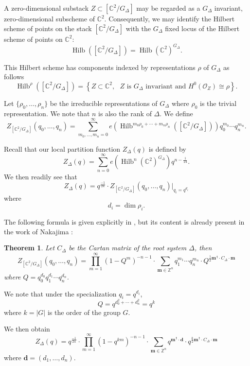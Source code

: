 \documentclass{amsart}
\newtheorem{theorem}{Theorem}[section]
\theoremstyle{definition}
\newcommand{\half}{\frac{1}{2}}
\newcommand{\CC} {{\mathbb C}}          %
\newcommand{\ZZ} {{\mathbb Z}}		%
\renewcommand{\O}{\mathcal{O}}
\renewcommand{\top}{\,\mathsf{t}}
\newcommand{\mvec}{\bm{m}}
\newcommand{\dvec}{\bm{d }}
\newcommand{\Hilb}{\operatorname{Hilb}}
\begin{document}
A zero-dimensional substack $Z\subset [\CC^{2}/G_{\Delta}]$ may be
regarded as a $G_{\Delta}$ invariant, zero-dimensional subscheme of
$\CC^{2}$. Consequently, we may identify the Hilbert scheme of points
on the stack $[\CC^{2}/G_{\Delta}]$ with the $G_{\Delta}$ fixed locus
of the Hilbert scheme of points on $\CC^{2}$: 
\[
\Hilb \left([\CC^{2}/G_{\Delta}] \right) = \Hilb
(\CC^{2})^{G_{\Delta}} .
\]

This Hilbert scheme has components indexed by representations $\rho$
of $G_{\Delta}$ as follows
\begin{equation*}
\Hilb^{\rho} \left([\CC^{2}/G_{\Delta}] \right) = \left\{ Z\subset
\CC^{2}, \text{ $Z$ is $G_{\Delta}$ invariant and $H^{0}(\O_{Z})\cong
\rho $} \right\}.
\end{equation*}

Let $\{\rho_{0},\dotsc ,\rho_{n} \}$ be the irreducible
representations of $G_{\Delta}$ where $\rho_{0}$ is the trivial
representation. We note that $n$ is also the rank of $\Delta$. We
define
\[
Z_{[\CC^{2}/G_{\Delta}]} (q_{0},\dotsc ,q_{n}) = \sum_{m_{0},\dotsc
,m_{n}=0}^{\infty} e\left(\Hilb^{m_{0}\rho_{0}+\dotsb
+m_{n}\rho_{n}}([\CC^{2}/G_{\Delta}]) \right) q_{0}^{m_{0}}\dotsb
q_{n}^{m_{n}} .
\]

Recall that our local partition function $Z_{\Delta}(q)$ is defined by
\[
Z_{\Delta}(q) = \sum_{n=0}^{\infty}
e\left(\Hilb^{n}(\CC^{2})^{G_{\Delta}} \right) q^{n-\frac{1}{24}}. 
\]
We then readily see that
\[
Z_{\Delta}(q) = q^{\frac{-1}{24}}\cdot  Z_{[\CC^{2}/G_{\Delta}]}
(q_{0},\dotsc ,q_{n})|_{q_{i}=q^{d_{i}}}
\]
where
\[
d_{i} =\dim \rho_{i}.
\]

The following formula is given explicitly in \cite[Thm~1.3]{gyenge2015euler}, but its content is already present in the work of Nakajima \cite{nakajima2002geometric}:
\begin{theorem} \label{thm: Zorbifold formula}
Let $C_{\Delta}$ be the Cartan matrix of the root system $\Delta$,
then 
\[
Z_{[\CC^{2}/G_{\Delta}]} (q_{0},\dotsc ,q_{n}) = \prod_{m=1}^{\infty}
(1-Q^{m})^{-n-1} \cdot \sum_{\mvec \in \ZZ^{n}} q_{1}^{m_{1}}\dotsb
q_{n}^{m_{n}} \cdot Q^{\half \mvec^{\top}\cdot C_{\Delta}\cdot \mvec}
\]
where $Q=q_{0}^{d_{0}}q_{1}^{d_{1}}\dotsb q_{n}^{d_{n}}$.
\end{theorem}
We note that under the specialization $q_{i}=q^{d_{i}}$, 
\[
Q=q^{d_{0}^{2}+\dotsb +d_{n}^{2}} = q^{k}
\]
where $k=|G|$ is the order of the group $G$.

We then obtain
\[
Z_{\Delta}(q) = q^{\frac{-1}{24}}\cdot
\prod_{m=1}^{\infty}(1-q^{km})^{-n-1} \cdot \sum_{\mvec \in \ZZ^{n}}
q^{\mvec^{\top}\cdot \dvec} \cdot q^{\frac{k}{2}\mvec^{\top}\cdot C_{\Delta}\cdot \mvec}
\]
where $\dvec =(d_{1},\dotsc ,d_{n})$.
\end{document}
